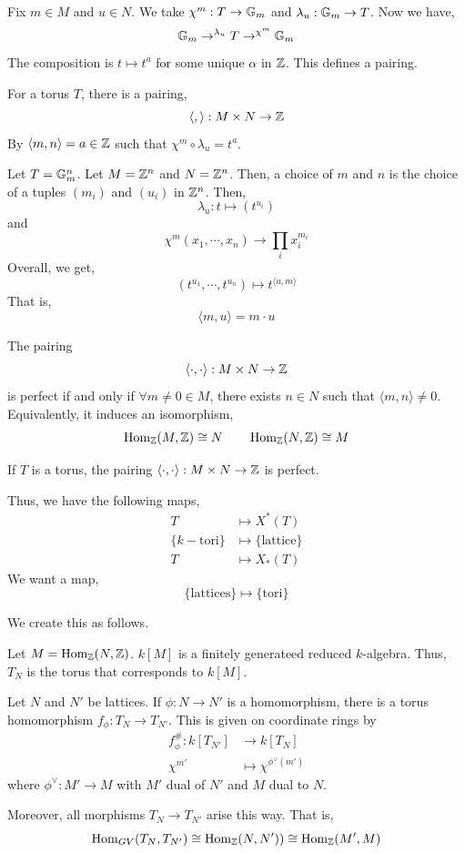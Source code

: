 \documentclass[12pt]{amsart}
\begin{document}
Fix $m \in M$ and $u \in N$. We take $\chi^m: T \to \mathbb G_m$ and $\lambda_u: \mathbb G_m \to T$. Now we have, 
\[ \mathbb G_m \to^{\lambda_u} T \to^{\chi^m} \mathbb G_m\]
The composition is $t \mapsto t^a$ for some unique $\alpha$ in $\mathbb Z$. This defines a pairing.
 
\begin{definition}
    For a torus $T$, there is a pairing, 
    \[ \langle, \rangle: M \times N \to \mathbb Z \]
    By $\langle m, n \rangle = a \in \mathbb Z$ such that $\chi^m \circ \lambda_u = t^a$. 
\end{definition}

\begin{example}
    Let $T = \mathbb G_m^n$. Let $M = \mathbb Z^n$ and $N = \mathbb Z^n$. Then, a choice of $m$ and $n$ is the choice of a tuples $(m_i)$ and $(u_i)$ in $\mathbb Z^n$. Then, 
    \[ \lambda_u: t \mapsto (t^{u_i})\]
    and
    \[ \chi^m(x_1, \cdots, x_n) \to \prod_i x_i^{m_i}\]
    Overall, we get, 
    \[ (t^{u_1}, \cdots, t^{u_n}) \mapsto t^{\langle u, m \rangle}\]
    That is, 
    \[ \langle m, u \rangle = m \cdot u\]
\end{example}

\begin{definition}
    The pairing
    \[ \langle \cdot, \cdot \rangle : M \times N \to \mathbb Z\]
    is perfect if and only if $\forall m \neq 0 \in M$, there exists $n \in N$ such that $\langle m, n \rangle \neq 0$. Equivalently, it induces an isomorphism, 
    \[ \operatorname{Hom}_\mathbb Z(M, \mathbb Z) \cong N \qquad \operatorname{Hom}_\mathbb Z(N, \mathbb Z) \cong M\]
\end{definition}

\begin{theorem}
    If $T$ is a torus, the pairing $\langle \cdot , \cdot \rangle: M \times N \to \mathbb Z$ is perfect. 
\end{theorem}

Thus, we have the following maps, 
\begin{align*}
    T &\mapsto X^*(T) \\
    \{k-\text{tori}\} &\mapsto \{\text{lattice}\} \\
    T &\mapsto X_*(T)
\end{align*}
We want a map, 
\[ \{\text{lattices}\} \mapsto \{\text{tori}\}\]

We create this as follows. 

Let $M = \operatorname{Hom}_\mathbb Z(N, \mathbb Z)$. $k[M]$ is a finitely generateed reduced $k$-algebra. Thus, $T_N$ is the torus that corresponds to $k[M]$. 

\begin{theorem}
    Let $N$ and $N'$ be lattices. If $\phi: N \to N'$ is a homomorphism, there is a torus homomorphism $f_\phi: T_N \to T_{N'}$. This is given on coordinate rings by
    \begin{align*}
        f_\phi^\#: k[T_{N'}] &\to k[T_N] \\
        \chi^{m'} &\mapsto  \chi^{\phi^\vee(m')}
    \end{align*}
    where $\phi^\vee: M' \to M$ with $M'$ dual of $N'$ and $M$ dual to $N$. 

    Moreover, all morphisms $T_N \to T_{N'}$ arise this way. That is, 
    \[ \operatorname{Hom}_{GV}(T_N, T_{N'}) \cong \operatorname{Hom}_\mathbb Z(N, N')) \cong \operatorname{Hom}_\mathbb Z(M', M) \]
\end{theorem}
\end{document}
